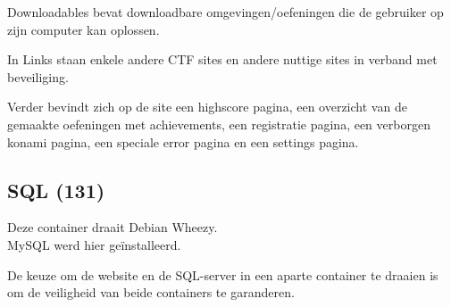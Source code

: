 Downloadables bevat downloadbare omgevingen/oefeningen die de gebruiker op zijn computer kan oplossen.

In Links staan enkele andere CTF sites en andere nuttige sites in verband met beveiliging.

Verder bevindt zich op de site een highscore pagina, een overzicht van de gemaakte oefeningen met achievements, een registratie pagina, een verborgen konami pagina, een speciale error pagina en een settings pagina.
\subsection{SQL (131)}
Deze container draait Debian Wheezy.\\
MySQL werd hier ge\"installeerd.

De keuze om de website en de SQL-server in een aparte container te draaien is om de veiligheid van beide containers te garanderen.

